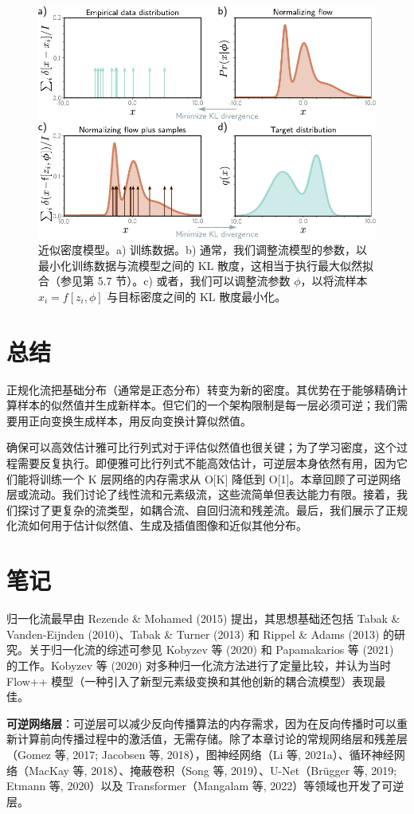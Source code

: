 \documentclass[lang=cn,newtx,10pt,scheme=chinese]{elegantbook}
\begin{document}
\begin{figure}[ht!]
\centering
\includegraphics[width=0.7\linewidth]{PDFFigures/UDLChap16PDF/FlowTypeII.pdf}
\caption{近似密度模型。a) 训练数据。b) 通常，我们调整流模型的参数，以最小化训练数据与流模型之间的 KL 散度，这相当于执行最大似然拟合（参见第 5.7 节）。c) 或者，我们可以调整流参数 \(\phi\)，以将流样本 \(x_i = f[z_i , \phi]\) 与目标密度之间的 KL 散度最小化。}
\end{figure}


\section{总结}
正规化流把基础分布（通常是正态分布）转变为新的密度。其优势在于能够精确计算样本的似然值并生成新样本。但它们的一个架构限制是每一层必须可逆；我们需要用正向变换生成样本，用反向变换计算似然值。

确保可以高效估计雅可比行列式对于评估似然值也很关键；为了学习密度，这个过程需要反复执行。即便雅可比行列式不能高效估计，可逆层本身依然有用，因为它们能将训练一个 K 层网络的内存需求从 O[K] 降低到 O[1]。本章回顾了可逆网络层或流动。我们讨论了线性流和元素级流，这些流简单但表达能力有限。接着，我们探讨了更复杂的流类型，如耦合流、自回归流和残差流。最后，我们展示了正规化流如何用于估计似然值、生成及插值图像和近似其他分布。

\section{笔记}
归一化流最早由 Rezende \& Mohamed (2015) 提出，其思想基础还包括 Tabak \& Vanden-Eijnden (2010)、Tabak \& Turner (2013) 和 Rippel \& Adams (2013) 的研究。关于归一化流的综述可参见 Kobyzev 等 (2020) 和 Papamakarios 等 (2021) 的工作。Kobyzev 等 (2020) 对多种归一化流方法进行了定量比较，并认为当时 Flow++ 模型（一种引入了新型元素级变换和其他创新的耦合流模型）表现最佳。

\textbf{可逆网络层}：可逆层可以减少反向传播算法的内存需求，因为在反向传播时可以重新计算前向传播过程中的激活值，无需存储。除了本章讨论的常规网络层和残差层（Gomez 等, 2017; Jacobsen 等, 2018），图神经网络（Li 等, 2021a）、循环神经网络（MacKay 等, 2018）、掩蔽卷积（Song 等, 2019）、U-Net（Brügger 等, 2019; Etmann 等, 2020）以及 Transformer（Mangalam 等, 2022）等领域也开发了可逆层。
\end{document}
